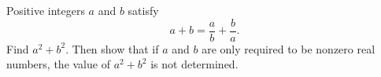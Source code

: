 Positive integers $a$ and $b$ satisfy
\[
a+b=\dfrac {a}{b}+\dfrac {b}{a} .
\]
Find $a^2+b^2$. Then show that if $a$ and $b$ are only required to be nonzero real numbers, the value of $a^2+b^2$ is not determined.

